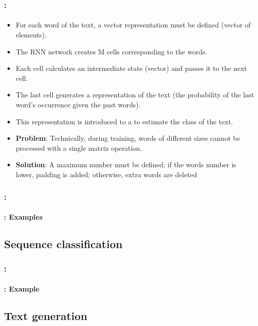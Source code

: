 \documentclass[xcolor=table]{beamer}
\begin{document}
\begin{frame}
	\frametitle{\insertshortsubtitle: \insertsection}
	\framesubtitle{\insertsubsection}
	
	\begin{itemize}
			\item For each word of the text, a vector representation must be defined (vector of  elements).
			\item The RNN network creates M cells corresponding to the  words.
			\item Each cell calculates an intermediate state (vector) and passes it to the next cell.
			\item The last cell generates a representation of the text (the probability of the last word's occurrence given the past words).
			\item This representation is introduced to a  to estimate the class of the text.
			\item \textbf{Problem}: Technically, during training, words of different sizes cannot be processed with a single matrix operation.
			\item \textbf{Solution}: \textcolor{yellow!30}{A maximum number must be defined; if the words number is lower, padding is added; otherwise, extra words are deleted}
		\end{itemize}
	
\end{frame}

\begin{frame}
	\frametitle{\insertshortsubtitle: \insertsection}
	\framesubtitle{\insertsubsection: Examples}
	
	
\end{frame}


\subsection{Sequence classification}

\begin{frame}
	\frametitle{\insertshortsubtitle: \insertsection}
	\framesubtitle{\insertsubsection: Example}
	
	
\end{frame}

\subsection{Text generation}
\end{document}
